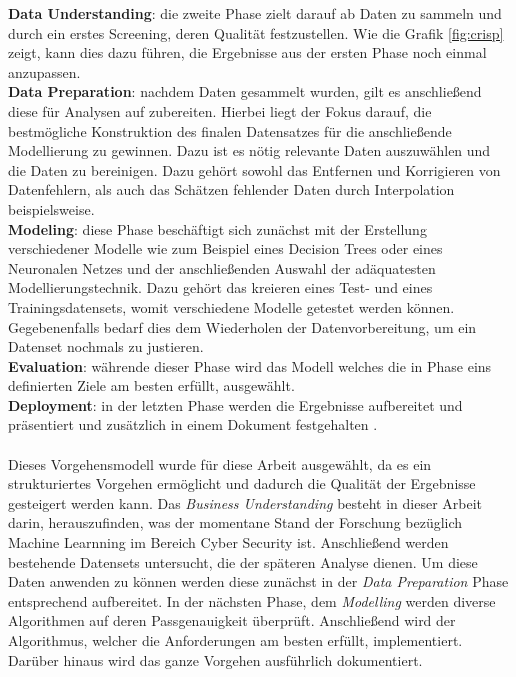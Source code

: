 \documentclass[
    12pt, %
    DIV10,
    ngerman, %
    a4paper, %
    oneside, %
    titlepage, %
    parskip=half, %
    headings=normal, %
    listof=totoc, %
    bibliography=totoc, %
    index=totoc, %
    captions=tableheading, %
    final %
]{scrreprt}
\begin{document}
\textbf{Data Understanding}: die zweite Phase zielt darauf ab Daten zu sammeln und durch ein erstes Screening, deren Qualität festzustellen. Wie die Grafik \ref{fig:crisp} zeigt, kann dies dazu führen, die Ergebnisse aus der ersten Phase noch einmal anzupassen.\\ 
\textbf{Data Preparation}: nachdem Daten gesammelt wurden, gilt es anschließend diese für Analysen auf zubereiten. Hierbei liegt der Fokus darauf, die bestmögliche Konstruktion des finalen Datensatzes für die anschließende Modellierung zu gewinnen. Dazu ist es nötig relevante Daten auszuwählen und die Daten zu bereinigen. Dazu gehört sowohl das Entfernen und Korrigieren von Datenfehlern, als auch das Schätzen fehlender Daten durch Interpolation beispielsweise.\\
\textbf{Modeling}: diese Phase beschäftigt sich zunächst mit der Erstellung verschiedener Modelle wie zum Beispiel eines Decision Trees oder eines Neuronalen Netzes und der anschließenden Auswahl der adäquatesten Modellierungstechnik. Dazu gehört das kreieren eines Test- und eines Trainingsdatensets, womit verschiedene Modelle getestet werden können. Gegebenenfalls bedarf dies dem Wiederholen der Datenvorbereitung, um ein Datenset nochmals zu justieren.\\
\textbf{Evaluation}: währende dieser Phase wird das Modell welches die in Phase eins definierten Ziele am besten erfüllt, ausgewählt.\\
\textbf{Deployment}: in der letzten Phase werden die Ergebnisse aufbereitet und präsentiert und zusätzlich in einem Dokument festgehalten \parencite{SmartVisionEurop}.\\\\
Dieses Vorgehensmodell wurde für diese Arbeit ausgewählt, da es ein strukturiertes Vorgehen ermöglicht und dadurch die Qualität der Ergebnisse gesteigert werden kann. Das \emph{Business Understanding} besteht in dieser Arbeit darin, herauszufinden, was der momentane Stand der Forschung bezüglich Machine Learnning im Bereich Cyber Security ist. Anschließend werden bestehende Datensets untersucht, die der späteren Analyse dienen.
Um diese Daten anwenden zu können werden diese zunächst in der \emph{Data Preparation} Phase entsprechend aufbereitet. In der nächsten Phase, dem \emph{Modelling} werden diverse Algorithmen auf deren Passgenauigkeit überprüft. Anschließend wird der Algorithmus, welcher die Anforderungen am besten erfüllt, implementiert. Darüber hinaus wird das ganze Vorgehen ausführlich dokumentiert.
\end{document}
